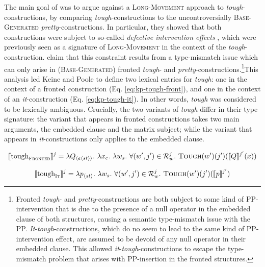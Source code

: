 \documentclass[11pt]{article}
\begin{document}
The main goal of \cite{Keine2017} was to argue against a \textsc{Long-Movement} approach to \textit{tough}-constructions, by comparing \textit{tough}-constructions to the uncontroversially \textsc{Base-Generated} \textit{pretty}-constructions. In particular, they showed that both constructions were subject to so-called \textit{defective intervention effects} \cite{Hartman2011}, which were previously seen as a signature of \textsc{Long-Movement} in the context of the \textit{tough}-construction. \cite{Keine2017} claim that this constraint results from a type-mismatch issue which can only arise in (\textsc{Base-Generated}) fronted \textit{tough}- and \textit{pretty}-constructions.\footnote{Fronted \textit{tough}- and \textit{pretty}-constructions are both subject to some kind of PP-intervention that is due to the presence of a null operator in the embedded clause of both structures, causing a semantic type-mismatch issue with the PP. \textit{It}-\textit{tough}-constructions, which do no seem to lead to the same kind of PP-intervention effect, are assumed to be devoid of any null operator in their embedded clause. This allowed \textit{it}-\textit{tough}-constructions to escape the type-mismatch problem that arises with PP-insertion in the fronted structures.}This analysis led Keine and Poole to define two lexical entries for \textit{tough}: one in the context of a fronted construction (Eq. \ref{eq:kp-tough-front}), and one in the context of an \textit{it}-construction (Eq. \ref{eq:kp-tough-it}). In other words, \textit{tough} was considered to be lexically ambiguous. Crucially, the two variants of \textit{tough} differ in their type signature: the variant that appears in fronted constructions takes two main arguments, the embedded clause and the matrix subject; while the variant that appears in \textit{it}-constructions only applies to the embedded clause.
	

	\begin{equation}
	\llbracket\text{tough}_{\text{\textsc{Fronted}}}\rrbracket^j = \lambda Q_{\langle e \langle st \rangle\rangle}. \ \lambda x_e. \ \lambda w_s. \ \forall (w', j') \in \mathcal{R}_w^j. \ \text{\textsc{Tough}}(w')(j')(\llbracket Q \rrbracket^{j'}(x))
	\end{equation}\label{eq:kp-tough-front}

	\begin{equation}
	\llbracket\text{tough}_{\text{\textsc{It}}}\rrbracket^j = \lambda p_{\langle st \rangle}. \ \lambda w_s. \ \forall (w', j') \in \mathcal{R}_w^j. \ \text{\textsc{Tough}}(w')(j')(\llbracket p \rrbracket^{j'})
	\end{equation}\label{eq:kp-tough-it}
\end{document}
